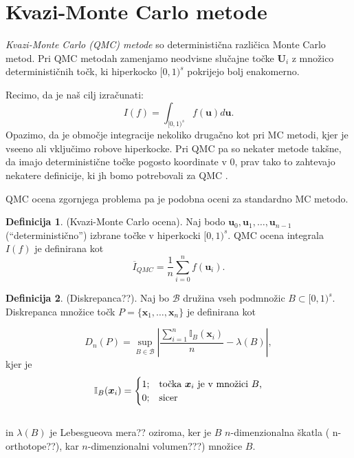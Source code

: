 \documentclass[12pt,a4paper, reqno]{amsart}
\theoremstyle{definition} %
\newtheorem{definicija}{Definicija}[section]
\theoremstyle{plain} %
\newcommand{\U}{\boldsymbol U}
\begin{document}
\vspace{5mm}
\section{Kvazi-Monte Carlo metode}
\vspace{3mm}

\textit{Kvazi-Monte Carlo (QMC) metode} so deterministična različica Monte Carlo metod. Pri QMC metodah zamenjamo neodvisne slučajne točke $\U_i$ z množico determinističnih  točk, ki hiperkocko $[0,1)^s$ pokrijejo bolj enakomerno.

 Recimo, da je naš cilj izračunati:
\[
I(f) = \int_{[0,1)^s} f(\boldsymbol u)d\boldsymbol u.
\] 
Opazimo, da je območje integracije nekoliko drugačno kot pri MC metodi, kjer je vseeno ali vključimo robove hiperkocke. Pri QMC pa so nekater metode takšne, da imajo deterministične točke pogosto koordinate v 0, prav tako to zahtevajo nekatere definicije, ki jh bomo potrebovali za QMC .

QMC ocena zgornjega problema pa je podobna oceni za standardno MC metodo.

\begin{definicija}{(Kvazi-Monte Carlo ocena).} 
Naj bodo $\boldsymbol u_0,\boldsymbol u_1,\ldots,\boldsymbol u_{n-1}$ (``deterministično'') izbrane točke v hiperkocki $[0,1)^s$. QMC ocena integrala $I(f)$ je definirana kot
\[
\overline{I}_{QMC} = \frac{1}{n} \sum_{i=0}^{n} f(\boldsymbol u_i).
\]
\end{definicija}
\vspace{1mm}

\begin{definicija}{(Diskrepanca??)}.
Naj bo $\mathcal{B}$ družina vseh podmnožic $B \subset[0,1)^s$. Diskrepanca množice točk $P = \{\boldsymbol x_1,\ldots,\boldsymbol x_n\}$ je definirana kot

\begin{equation}
D_n(P) =\sup\limits_{B \in \mathcal{B}}\left\lvert\frac{\sum_{i = 1}^n \mathbb {I}_B(\boldsymbol x_i)}{n} - \lambda(B) \right\rvert,
\end{equation}
kjer je 
\vspace{2mm}
\[
\mathbb{I}_B(\boldsymbol x_i) =
  \begin{cases}
  1; & \mbox{točka $\boldsymbol x_i$ je v množici $B$,} \\	
  0; & \mbox{sicer}$$
  \end{cases}
  \] 
  \\[2mm]
 in $\lambda(B)$ je Lebesgueova mera?? oziroma, ker je $B$ $n$-dimenzionalna škatla ( n-orthotope??), kar $n$-dimenzionalni volumen???) množice $B$.
\end{definicija}
\end{document}

